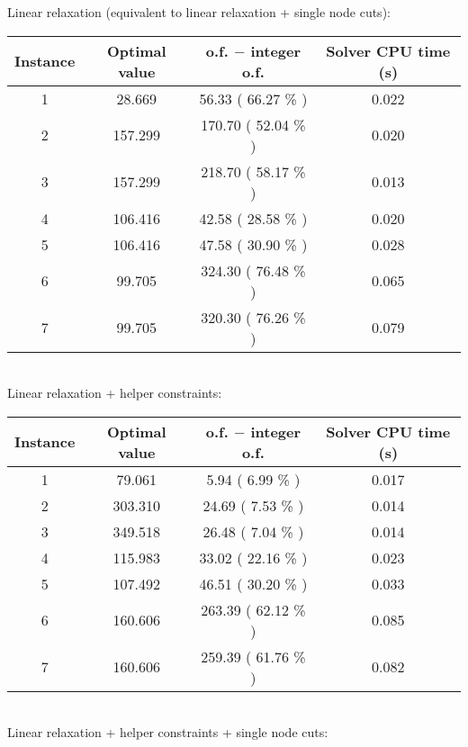 Linear relaxation (equivalent to linear relaxation + single node cuts):
\begin{table}[h!]
	\centering
	\begin{tabular}{|c|c|c|c|}
		\hline
		\textbf{Instance} & \textbf{Optimal value} & \textbf{o.f. $-$ integer o.f.} & \textbf{Solver CPU time (s)} \\
		\hline
		1 &  28.669 &  56.33 ( 66.27 \% ) & 0.022 \\ \hline
		2 & 157.299 & 170.70 ( 52.04 \% ) & 0.020 \\ \hline
		3 & 157.299 & 218.70 ( 58.17 \% ) & 0.013 \\ \hline
		4 & 106.416 &  42.58 ( 28.58 \% ) & 0.020 \\ \hline
		5 & 106.416 &  47.58 ( 30.90 \% ) & 0.028 \\ \hline
		6 &  99.705 & 324.30 ( 76.48 \% ) & 0.065 \\ \hline
		7 &  99.705 & 320.30 ( 76.26 \% ) & 0.079 \\ \hline
	\end{tabular}
	\label{tab:instance_costs}
\end{table}
\\
Linear relaxation + helper constraints:
\begin{table}[h!]
	\centering
	\begin{tabular}{|c|c|c|c|}
		\hline
		\textbf{Instance} & \textbf{Optimal value} & \textbf{o.f. $-$ integer o.f.} & \textbf{Solver CPU time (s)} \\
		\hline
		1 &  79.061 &   5.94 (  6.99 \% ) & 0.017 \\ \hline
		2 & 303.310 &  24.69 (  7.53 \% ) & 0.014 \\ \hline
		3 & 349.518 &  26.48 (  7.04 \% ) & 0.014 \\ \hline
		4 & 115.983 &  33.02 ( 22.16 \% ) & 0.023 \\ \hline
		5 & 107.492 &  46.51 ( 30.20 \% ) & 0.033 \\ \hline
		6 & 160.606 & 263.39 ( 62.12 \% ) & 0.085 \\ \hline
		7 & 160.606 & 259.39 ( 61.76 \% ) & 0.082 \\ \hline
	\end{tabular}
	\label{tab:instance_costs}
\end{table}
\\
Linear relaxation + helper constraints + single node cuts:
